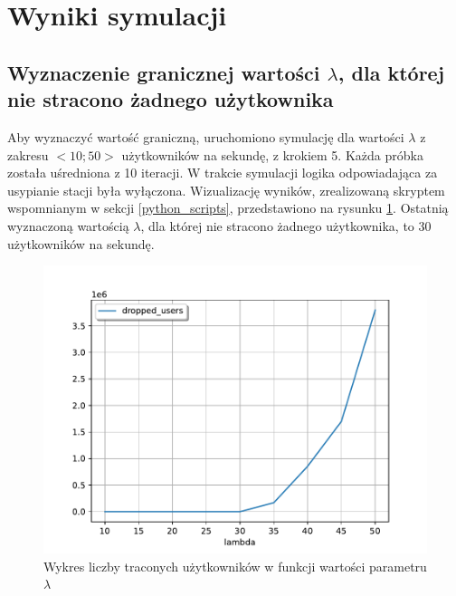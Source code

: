 \newpage
\section{Wyniki symulacji}
\subsection{Wyznaczenie granicznej wartości $\lambda$, dla której nie stracono żadnego użytkownika}
Aby wyznaczyć wartość graniczną, uruchomiono symulację dla wartości $\lambda$ z zakresu $<10; 50>$ użytkowników na sekundę, z krokiem 5. Każda próbka została uśredniona z 10 iteracji. W trakcie symulacji logika odpowiadająca za usypianie stacji była wyłączona. Wizualizację wyników, zrealizowaną skryptem wspomnianym w sekcji \ref{python_scripts}, przedstawiono na rysunku \ref{dropped_users_lambda}. Ostatnią wyznaczoną wartością $\lambda$, dla której nie stracono żadnego użytkownika, to 30 użytkowników na sekundę.
\begin{figure}[h]
\center
\includegraphics[scale=0.65]{img/dropped_users_lambda.pdf} 
\caption{Wykres liczby traconych użytkowników w funkcji wartości parametru $\lambda$}
\label{dropped_users_lambda}
\end{figure}

